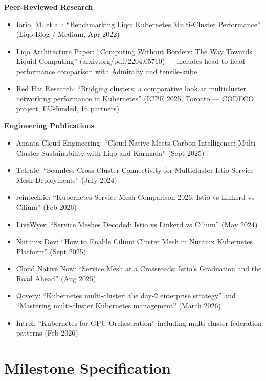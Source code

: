 \documentclass[11pt,letterpaper]{article}
\newcommand{\stageheader}[2]{%
  \noindent\colorbox{#2}{\makebox[\textwidth][l]{%
    \textcolor{white}{\bfseries\sffamily\hspace{6pt}#1\hspace{6pt}}}}%
  \vspace{0.5em}\par%
}
\begin{document}
\textbf{Peer-Reviewed Research}
\begin{itemize}[leftmargin=1.5em, itemsep=0pt]
  \item Iorio, M. et al.: ``Benchmarking Liqo: Kubernetes Multi-Cluster Performance'' (Liqo Blog / Medium, Apr 2022)
  \item Liqo Architecture Paper: ``Computing Without Borders: The Way Towards Liquid Computing'' (arxiv.org/pdf/2204.05710) --- includes head-to-head performance comparison with Admiralty and tensile-kube
  \item Red Hat Research: ``Bridging clusters: a comparative look at multicluster networking performance in Kubernetes'' (ICPE 2025, Toronto --- CODECO project, EU-funded, 16 partners)
\end{itemize}

\textbf{Engineering Publications}
\begin{itemize}[leftmargin=1.5em, itemsep=0pt]
  \item Ananta Cloud Engineering: ``Cloud-Native Meets Carbon Intelligence: Multi-Cluster Sustainability with Liqo and Karmada'' (Sept 2025)
  \item Tetrate: ``Seamless Cross-Cluster Connectivity for Multicluster Istio Service Mesh Deployments'' (July 2024)
  \item reintech.io: ``Kubernetes Service Mesh Comparison 2026: Istio vs Linkerd vs Cilium'' (Feb 2026)
  \item LiveWyer: ``Service Meshes Decoded: Istio vs Linkerd vs Cilium'' (May 2024)
  \item Nutanix Dev: ``How to Enable Cilium Cluster Mesh in Nutanix Kubernetes Platform'' (Sept 2025)
  \item Cloud Native Now: ``Service Mesh at a Crossroads: Istio's Graduation and the Road Ahead'' (Aug 2025)
  \item Qovery: ``Kubernetes multi-cluster: the day-2 enterprise strategy'' and ``Mastering multi-cluster Kubernetes management'' (March 2026)
  \item Introl: ``Kubernetes for GPU Orchestration'' including multi-cluster federation patterns (Feb 2026)
\end{itemize}

\newpage

\stageheader{STAGE 3 --- MISSION PACKAGE}{tertiary}

\section{Milestone Specification}
\end{document}
